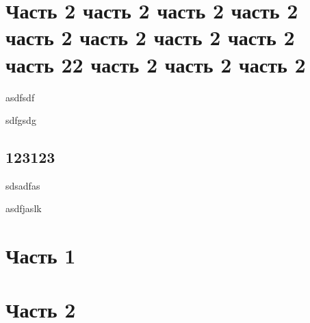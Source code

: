\documentclass[a4paper,10pt]{article}
\begin{document}
%
%
%
%
%
\section{Часть 2 часть 2 часть 2 часть 2 часть 2 часть 2 часть 2 часть 2 часть 22 часть 2 часть 2 часть 2}
asdfsdf

sdfgsdg

\subsection{123123}

sdsadfas

asdfjaslk

\section{Часть 1}
\subsection{\lipsum[1]}

\section{Часть 2}

\label{lastpage}
\end{document}
